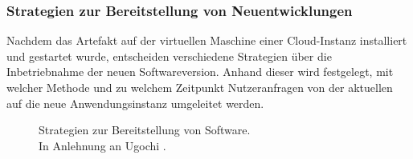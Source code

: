 \subsubsection{Strategien zur Bereitstellung von Neuentwicklungen}
\label{sec:Bereitstellungs_Strategien}
Nachdem das Artefakt auf der virtuellen Maschine einer Cloud-Instanz installiert und gestartet wurde, entscheiden verschiedene Strategien über die Inbetriebnahme der neuen Softwareversion. Anhand dieser wird festgelegt, mit welcher Methode und zu welchem Zeitpunkt Nutzeranfragen von der aktuellen auf die neue Anwendungsinstanz umgeleitet werden.
\begin{center}
	\begin{figure}[H]
		\centering
		\caption[Strategien zur Bereitstellung von Software]{Strategien zur Bereitstellung von Software.\\ In Anlehnung an Ugochi \cite{Ugochi.20220503}.}
		\label{fig:DS}
	\end{figure}
\end{center}
\vspace*{-10mm}
